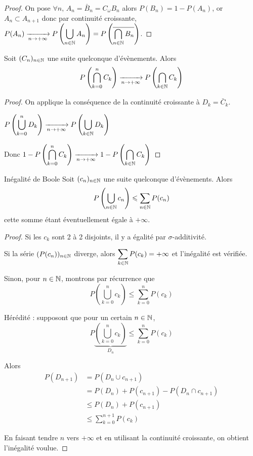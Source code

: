 \begin{proof}
    On pose $\forall n, \, A_n = \bar B_n = C_\omega B_n$ alors 
    $P(B_n) = 1 - P(A_n)$, or $A_n \subset A_{n + 1}$ donc par continuité croissante, 
    $\displaystyle P(A_n) \xrightarrow[n \to + \infty]{} P\left( \bigcup_{n \in \mathbb{N}} A_n \right) = P\left( \overline{ \bigcap_{n \in \mathbb{N}} B_n } \right)$.
\end{proof}

\begin{proposition}{}{}
    Soit $(C_n)_{n \in \mathbb{N}}$ une suite quelconque d'évènements. Alors
    $$P\left( \bigcap_{k = 0}^n C_k \right) \xrightarrow[n \to + \infty]{} P\left( \bigcap_{k \in \mathbb{N}} C_k \right)$$
\end{proposition}

\begin{proof}
    On applique la conséquence de la continuité croissante à $D_k = \bar C_k$.

    $\displaystyle P\left( \bigcup_{k = 0}^n D_k \right) \xrightarrow[n \to + \infty]{} P\left( \bigcup_{k \in \mathbb{N}} D_k \right)$

    Donc $\displaystyle 1 - P\left( \bigcap_{k = 0}^n C_k \right) \xrightarrow[n \to + \infty]{} 1 - P\left( \bigcap_{k \in \mathbb{N}} C_k \right)$
\end{proof}

\begin{theoreme}{Inégalité de Boole}{}
    Soit $(c_n)_{n \in \mathbb{N}}$ une suite quelconque  d'évènements. Alors 
    $$ P\left( \bigcup_{n \in \mathbb{N}} c_n \right) \leqslant \sum_{n \in \mathbb{N}} P(c_n) $$
    cette somme étant éventuellement égale à $+ \infty$.
\end{theoreme}

\begin{proof}
    Si les $c_k$ sont 2 à 2 disjoints, il y a égalité par $\sigma$-additivité.


    \svspace Si la série $(P(c_n))_{n \in \mathbb{N}}$ diverge, alors 
    $\displaystyle \sum_{k \in \mathbb{N}} P(c_k) = + \infty$ et l'inégalité est vérifiée.

    
    \svspace Sinon, pour $n \in \mathbb{N}$, montrons par récurrence que 
    $$ P\left( \bigcup_{k = 0}^n c_k \right) \leqslant \sum_{k = 0}^n P(c_k) $$

    Hérédité : supposont que pour un certain $n \in \mathbb{N}$, $$P \underbrace{\left( \bigcup_{k = 0}^n c_k \right) }_{D_n} \leqslant \sum_{k = 0}^n P(c_k) $$

    Alors 
    \begin{align}
        P(D_{n + 1}) & = P(D_n \cup c_{n + 1}) \\
        & = P(D_n) + P(c_{n + 1}) - P(D_n \cap c_{n + 1}) \\
        & \leqslant P(D_n) + P(c_{n + 1}) \\
        & \leqslant \sum_{k = 0}^{n + 1} P(c_k)
    \end{align}

    En faisant tendre $n$ vers $+ \infty$ et en utilisant la continuité croissante, on obtient l'inégalité voulue.
\end{proof}

